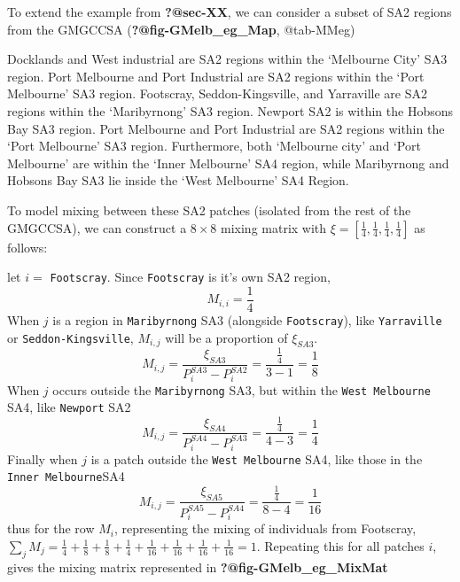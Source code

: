 \documentclass[
  letterpaper,
  DIV=11,
  numbers=noendperiod]{scrartcl}
\begin{document}
To extend the example from \textbf{?@sec-XX}, we can consider a subset
of SA2 regions from the GMGCCSA (\textbf{?@fig-GMelb\_eg\_Map},
@tab-MMeg)

Docklands and West industrial are SA2 regions within the `Melbourne
City' SA3 region. Port Melbourne and Port Industrial are SA2 regions
within the `Port Melbourne' SA3 region. Footscray, Seddon-Kingsville,
and Yarraville are SA2 regions within the `Maribyrnong' SA3 region.
Newport SA2 is within the Hobsons Bay SA3 region. Port Melbourne and
Port Industrial are SA2 regions within the `Port Melbourne' SA3 region.
Furthermore, both `Melbourne city' and `Port Melbourne' are within the
`Inner Melbourne' SA4 region, while Maribyrnong and Hobsons Bay SA3 lie
inside the `West Melbourne' SA4 Region.

To model mixing between these SA2 patches (isolated from the rest of the
GMGCCSA), we can construct a \(8 \times 8\) mixing matrix with
\(\xi = \left[ \frac{1}{4}, \frac{1}{4},\frac{1}{4},\frac{1}{4} \right]\)
as follows:

let \(i =\) \texttt{Footscray}. Since \texttt{Footscray} is it's own SA2
region, \[M_{i,i} = \frac{1}{4}\] When \(j\) is a region in
\texttt{Maribyrnong} SA3 (alongside \texttt{Footscray}), like
\texttt{Yarraville} or \texttt{Seddon-Kingsville}, \(M_{i,j}\) will be a
proportion of \(\xi_{SA3}\). \[
M_{i,j} = \frac{\xi_{SA3}}{P_{i}^{SA3} - P_{i}^{SA2}} = \frac{\frac{1}{4}}{3 - 1} = \frac{1}{8}
\] When \(j\) occurs outside the \texttt{Maribyrnong} SA3, but within
the \texttt{West\ Melbourne} SA4, like \texttt{Newport} SA2 \[
M_{i,j} = \frac{\xi_{SA4}}{P_{i}^{SA4} - P_{i}^{SA3}} = \frac{\frac{1}{4}}{4 - 3} = \frac{1}{4}
\] Finally when \(j\) is a patch outside the \texttt{West\ Melbourne}
SA4, like those in the \texttt{Inner\ Melbourne}SA4 \[
M_{i,j} = \frac{\xi_{SA5}}{P_{i}^{SA5} - P_{i}^{SA4}} = \frac{\frac{1}{4}}{8 - 4} = \frac{1}{16}
\] thus for the row \(M_{i}\), representing the mixing of individuals
from Footscray,
\(\sum\limits_{j}M_{j}= \frac{1}{4} +\frac{1}{8} + \frac{1}{8} + \frac{1}{4} + \frac{1}{16} + \frac{1}{16} + \frac{1}{16} + \frac{1}{16} = 1\).
Repeating this for all patches \(i\), gives the mixing matrix
represented in \textbf{?@fig-GMelb\_eg\_MixMat}
\end{document}
